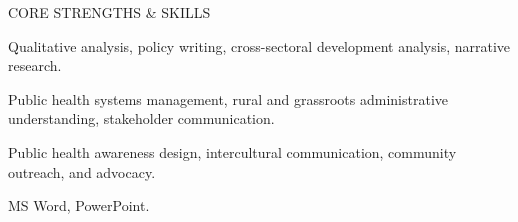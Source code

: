 \begin{rubric}{CORE STRENGTHS \& SKILLS}

   Qualitative analysis, policy writing, cross-sectoral development analysis, narrative research.

  Public health systems management, rural and grassroots administrative understanding, stakeholder communication.

  Public health awareness design, intercultural communication, community outreach, and advocacy.

\entry*[Tools:]
  MS Word, PowerPoint.

\end{rubric}